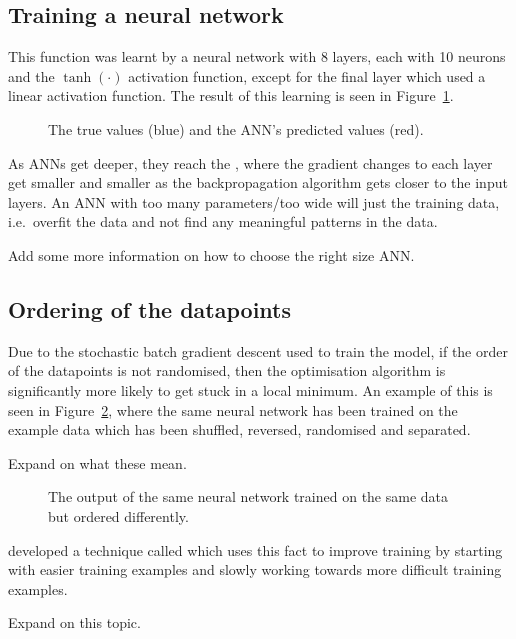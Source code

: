 \subsection{Training a neural network}

This function was learnt by a neural network with 8 layers, each with 10 neurons and the \(\tanh(\cdot)\) activation function, except for the final layer which used a linear activation function.
The result of this learning is seen in Figure~\ref{fig:ann-preds}.

\begin{figure}[htbp]
	\centering
	
	\caption{The true values (blue) and the ANN's predicted values (red).}
	\label{fig:ann-preds}
\end{figure}

As \acp{ANN} get deeper, they reach the , where the gradient changes to each layer get smaller and smaller as the backpropagation algorithm gets closer to the input layers.
An \ac{ANN} with too many parameters/too wide will just  the training data, i.e.\ overfit the data and not find any meaningful patterns in the data.

\begin{todo}
	Add some more information on how to choose the right size ANN.
\end{todo}

\subsection{Ordering of the datapoints}

Due to the stochastic batch gradient descent used to train the model, if the order of the datapoints is not randomised, then the optimisation algorithm is significantly more likely to get stuck in a local minimum.
An example of this is seen in Figure~\ref{fig:compare-order}, where the same neural network has been trained on the example data which has been shuffled, reversed, randomised and separated.

\begin{todo}
	Expand on what these mean.
\end{todo}

\begin{figure}[htbp]
	\centering
	
	\caption{The output of the same neural network trained on the same data but ordered differently.}
	\label{fig:compare-order}
\end{figure}

\textcite{bengio2009} developed a technique called  which uses this fact to improve training by starting with easier training examples and slowly working towards more difficult training examples.

\begin{todo}
	Expand on this topic.
\end{todo}
